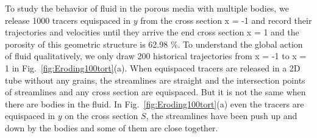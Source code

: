 \documentclass[preprint, 10pt]{elsarticle}
\begin{document}
{To study the behavior of fluid in the porous media with multiple bodies, 
we release 1000 tracers equispaced in $y$ from the 
cross section x = -1 and record their trajectories and velocities
until they arrive the end cross section x = 1 
and the porosity of this geometric structure is 62.98 \%. 
To understand the global action of fluid qualitatively, 
we only draw 200 historical trajectories from x = -1 to x = 1 
in Fig.~\ref{fig:Eroding100tort}(a). 
When equispaced tracers are released in a 2D tube without any grains, 
the streamlines are straight 
and the intersection points of streamlines and any cross section are equispaced. 
But it is not the same when there are bodies in the fluid. 
In Fig.~\ref{fig:Eroding100tort}(a)
even the tracers are equispaced in $y$ on the cross section $S$, 
the streamlines have been push up and down by the bodies and
some of them are close together. 


}



\end{document}

